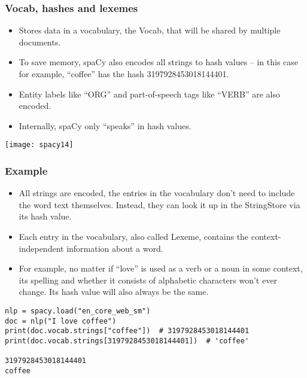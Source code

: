 \begin{frame}[fragile]\frametitle{Vocab, hashes and lexemes}
  \begin{itemize}
    \item Stores data in a vocabulary, the Vocab, that will be shared by multiple documents. 
		\item To save memory, spaCy also encodes all strings to hash values – in this case for example, “coffee” has the hash 3197928453018144401. 
		\item Entity labels like “ORG” and part-of-speech tags like “VERB” are also encoded. 
		\item Internally, spaCy only “speaks” in hash values.
  \end{itemize}
	
	\begin{center}
\texttt{[image: spacy14]}
\end{center}
	
\end{frame}

\begin{frame}[fragile]\frametitle{Example}



  \begin{itemize}
    \item All strings are encoded, the entries in the vocabulary don't need to include the word text themselves. Instead, they can look it up in the StringStore via its hash value. 
		\item Each entry in the vocabulary, also called Lexeme, contains the context-independent information about a word. 
		\item For example, no matter if “love” is used as a verb or a noun in some context, its spelling and whether it consists of alphabetic characters won't ever change. Its hash value will also always be the same.
  \end{itemize}

\begin{lstlisting}
nlp = spacy.load("en_core_web_sm")
doc = nlp("I love coffee")
print(doc.vocab.strings["coffee"])  # 3197928453018144401
print(doc.vocab.strings[3197928453018144401])  # 'coffee'

3197928453018144401
coffee
\end{lstlisting}
\end{frame}

